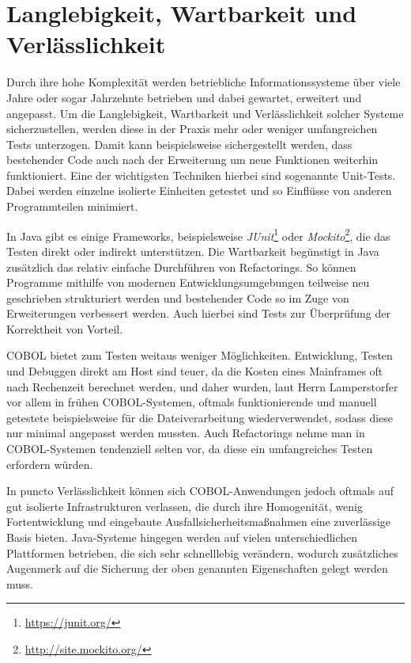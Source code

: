 \section{Langlebigkeit, Wartbarkeit und Verlässlichkeit} 

Durch ihre hohe Komplexität werden betriebliche Informationssysteme \idR über viele Jahre oder sogar Jahrzehnte betrieben und dabei gewartet, erweitert und angepasst. Um die Langlebigkeit, Wartbarkeit und Verlässlichkeit solcher Systeme sicherzustellen, werden diese in der Praxis mehr oder weniger umfangreichen Tests unterzogen. Damit kann beispielsweise sichergestellt werden, dass bestehender Code auch nach der Erweiterung um neue Funktionen weiterhin funktioniert. Eine der wichtigsten Techniken hierbei sind sogenannte Unit-Tests. Dabei werden einzelne isolierte Einheiten getestet und so Einflüsse von anderen Programmteilen minimiert. 

In Java gibt es einige Frameworks, beispielsweise \textit{JUnit}\footnote{\url{https://junit.org/} \visitedOn} oder \textit{Mockito}\footnote{\url{http://site.mockito.org/} \visitedOn}, die das Testen direkt oder indirekt unterstützen. Die Wartbarkeit begünstigt in Java zusätzlich das relativ einfache Durchführen von Refactorings. So können Programme mithilfe von modernen Entwicklungsumgebungen teilweise neu geschrieben \bzw strukturiert werden und bestehender Code so im Zuge von Erweiterungen verbessert werden. Auch hierbei sind Tests zur Überprüfung der Korrektheit von Vorteil. 

COBOL bietet zum Testen weitaus weniger Möglichkeiten. Entwicklung, Testen und Debuggen direkt am Host sind teuer, da die Kosten eines Mainframes oft nach Rechenzeit berechnet werden, und daher wurden, laut Herrn Lamperstorfer vor allem in frühen COBOL-Systemen, oftmals funktionierende und manuell getestete  beispielsweise für die Dateiverarbeitung wiederverwendet, sodass diese nur minimal angepasst werden mussten. Auch Refactorings nehme man in COBOL-Systemen tendenziell selten vor, da diese ein umfangreiches Testen erfordern würden.

In puncto Verlässlichkeit können sich COBOL-Anwendungen jedoch oftmals auf gut isolierte Infrastrukturen verlassen, die durch ihre Homogenität, wenig Fortentwicklung und eingebaute Ausfallsicherheitsmaßnahmen eine zuverlässige Basis bieten. Java-Systeme hingegen werden auf vielen unterschiedlichen Plattformen betrieben, die sich sehr schnelllebig verändern, wodurch zusätzliches Augenmerk auf die Sicherung der oben genannten Eigenschaften gelegt werden muss.